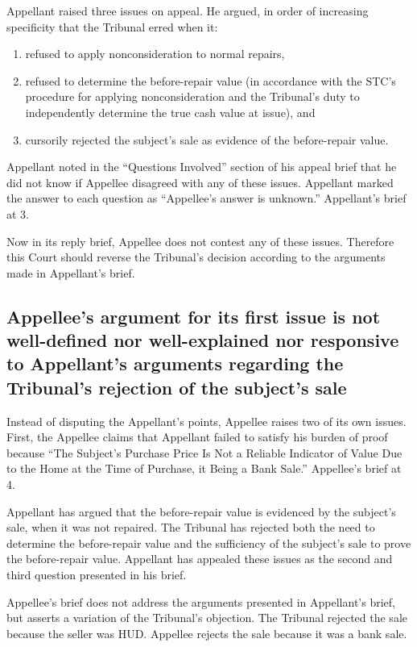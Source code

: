 \documentclass[12pt,\documentclassflag]{michiganCourtOfAppealsBrief}
\begin{document}
Appellant raised three issues on appeal. He argued, in order of increasing specificity that the Tribunal erred when it:

\begin{enumerate}
\item refused to apply nonconsideration to normal repairs,
\item refused to determine the before-repair value (in accordance with the STC's procedure for applying nonconsideration and the Tribunal's duty to independently determine the true cash value at issue), and
\item cursorily rejected the subject's sale as evidence of the before-repair value.
\end{enumerate}


Appellant noted in the ``Questions Involved'' section of his appeal brief that he did not know if Appellee disagreed with any of these issues. Appellant marked the answer to each question as ``Appellee's answer is unknown.'' Appellant's brief at 3.

Now in its reply brief, Appellee does not contest any of these issues. Therefore this Court should reverse the Tribunal's decision according to the arguments made in Appellant's brief.

\subsection{Appellee's argument for its first issue is not well-defined nor well-explained nor responsive to Appellant's arguments regarding the Tribunal's rejection of the subject's sale}
 
Instead of disputing the Appellant's points, Appellee raises two of its own issues. First, the Appellee claims that Appellant failed to satisfy his burden of proof because ``The Subject's Purchase Price Is Not a Reliable Indicator of Value Due to the Home at the Time of Purchase, it Being a Bank Sale.'' Appellee's brief at 4.

Appellant has argued that the before-repair value is evidenced by the subject's sale, when it was not repaired. The Tribunal has rejected both the need to determine the before-repair value and the sufficiency of the subject's sale to prove the before-repair value. Appellant has appealed these issues as the second and third question presented in his brief.

Appellee's brief does not address the arguments presented in Appellant's brief, but asserts a variation of the Tribunal's objection. The Tribunal rejected the sale because the seller was HUD. Appellee rejects the sale because it was a bank sale.
\end{document}
